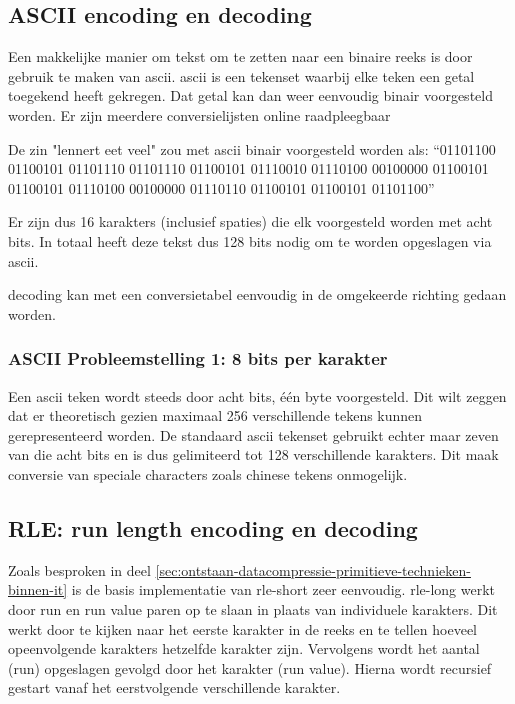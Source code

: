 \subsection{ASCII encoding en decoding}
\label{sec:primitieve-technieken-voorbeeld-ascii}
Een makkelijke manier om tekst om te zetten naar een binaire reeks is door gebruik te maken van \gls{ascii}. \Gls{ascii} is een tekenset waarbij elke teken een getal toegekend heeft gekregen. Dat getal kan dan weer eenvoudig binair voorgesteld worden. Er zijn meerdere conversielijsten online raadpleegbaar

De zin "lennert eet veel" zou met \gls{ascii} binair voorgesteld worden als: 
“01101100 01100101 01101110 01101110 01100101 01110010 01110100 00100000 01100101 01100101 01110100 00100000 01110110 01100101 01100101 01101100”

Er zijn dus 16 karakters (inclusief spaties) die elk voorgesteld worden met acht \glspl{bit}. In totaal heeft deze tekst dus 128 \glspl{bit} nodig om te worden opgeslagen via \gls{ascii}.

\Gls{decoding} kan met een conversietabel eenvoudig in de omgekeerde richting gedaan worden. 

\subsubsection{ASCII Probleemstelling 1: 8 bits per karakter}
\label{sec:primitieve-technieken-voorbeeld-ascii-probleem-1}
Een \gls{ascii} teken wordt steeds door acht \glspl{bit}, één \gls{byte} voorgesteld. Dit wilt zeggen dat er theoretisch gezien maximaal 256 verschillende tekens kunnen gerepresenteerd worden. De standaard \gls{ascii} tekenset gebruikt echter maar zeven van die acht \glspl{bit} en is dus gelimiteerd tot 128 verschillende karakters. Dit maak conversie van speciale characters zoals chinese tekens onmogelijk.

\subsection{RLE: run length encoding en decoding}
\label{sec:primitieve-technieken-voorbeeld-rle}
Zoals besproken in deel \ref{sec:ontstaan-datacompressie-primitieve-technieken-binnen-it} is de basis implementatie van \gls{rle-short} zeer eenvoudig. \Gls{rle-long} werkt door run en run value paren op te slaan in plaats van individuele karakters. Dit werkt door te kijken naar het eerste karakter in de reeks en te tellen hoeveel opeenvolgende karakters hetzelfde karakter zijn. Vervolgens wordt het aantal (run) opgeslagen gevolgd door het karakter (run value). Hierna wordt recursief gestart vanaf het eerstvolgende verschillende karakter.

